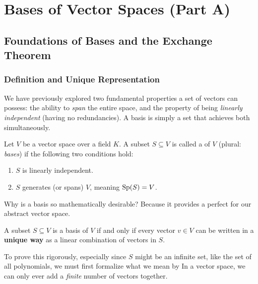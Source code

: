 \renewcommand{\thetheorem}{10.a.\arabic{theorem}}
\setcounter{theorem}{0}
\setcounter{chapter}{9}

\chapter{Bases of Vector Spaces (Part A)}

\section{Foundations of Bases and the Exchange Theorem}

\subsection{Definition and Unique Representation}

We have previously explored two fundamental properties a set of vectors can possess: the ability to \textit{span} the entire space, and the property of being \textit{linearly independent} (having no redundancies). A basis is simply a set that achieves both simultaneously.

\begin{definition}[Basis]
\label{def:basis}
Let $V$ be a vector space over a field $K$. A subset $S \subseteq V$ is called a  of $V$ (plural: \textit{bases}) if the following two conditions hold:
\begin{enumerate}
    \item $S$ is linearly independent.
    \item $S$ generates (or spans) $V$, meaning $\operatorname{Sp}(S) = V$.
\end{enumerate}
\end{definition}

Why is a basis so mathematically desirable? Because it provides a perfect  for our abstract vector space.

\begin{proposition}
\label{prop:unique_representation}
A subset $S \subseteq V$ is a basis of $V$ if and only if every vector $v \in V$ can be written in a \textbf{unique way} as a linear combination of vectors in $S$.
\end{proposition}

To prove this rigorously, especially since $S$ might be an infinite set, like the set of all polynomials, we must first formalize what we mean by  In a vector space, we can only ever add a \textit{finite} number of vectors together. 

